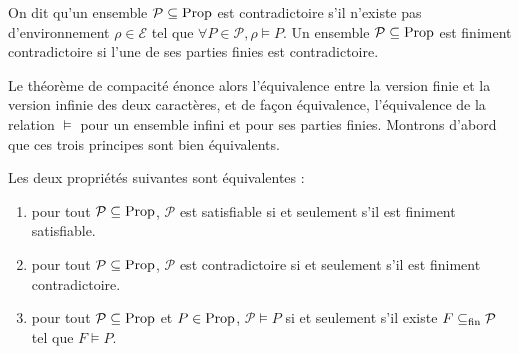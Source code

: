 \begin{definition}[Contradiction]
  On dit qu'un ensemble $\mathcal P\subseteq\operatorname{Prop}$ est contradictoire s'il
  n'existe pas d'environnement $\rho\in\mathcal E$ tel que
  $\forall P \in\mathcal P, \rho\models P$. Un ensemble
  $\mathcal P\subseteq \operatorname{Prop}$ est finiment contradictoire si l'une de ses
  parties finies est contradictoire.
\end{definition}

Le théorème de compacité énonce alors l'équivalence entre la version finie et la
version infinie des deux caractères, et de façon équivalence, l'équivalence de
la relation $\vDash$ pour un ensemble infini et pour ses parties finies.
Montrons d'abord que ces trois principes sont bien équivalents.

\begin{proposition}
  Les deux propriétés suivantes sont équivalentes :
  \begin{enumerate}[label=(\roman*)]
  \item\label{enum.compac.prop1} pour tout $\mathcal P\subseteq \operatorname{Prop}$,
    $\mathcal P$ est satisfiable si et seulement s'il est finiment satisfiable.
  \item\label{enum.compac.prop2} pour tout $\mathcal P\subseteq\operatorname{Prop}$,
    $\mathcal P$ est contradictoire si et seulement s'il est finiment
    contradictoire.
  \item\label{enum.compac.prop3} pour tout $\mathcal P\subseteq\operatorname{Prop}$ et
    $P\in\operatorname{Prop}$, $\mathcal P\vDash P$ si et seulement s'il existe
    $F\subseteq_{\mathrm{fin}} \mathcal P$ tel que $F\vDash P$.
  \end{enumerate}
\end{proposition}

